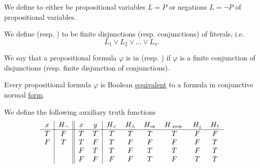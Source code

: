 \begin{Definition}\label{def:conjunctive_normal_form}
  We define  to either be propositional variables \( L = P \) or negations \( L = \neg P \) of propositional variables.

  We define  (resp. ) to be finite disjunctions (resp. conjunctions) of literals, i.e.
  \begin{equation*}
    L_1 \vee L_2 \vee \ldots \vee L_n.
  \end{equation*}

  We say that a propositional formula \( \varphi \) is in  (resp. ) if \( \varphi \) is a finite conjunction of disjunctions (resp. finite disjunction of conjunctions).
\end{Definition}

\begin{Proposition}\label{thm:conjunctive_normal_form_reduction}
  Every propositional formula \( \varphi \) is Boolean \hyperref[def:propositional_interpretation]{equivalent} to a formula in conjunctive normal \hyperref[def:conjunctive_normal_form]{form}.
\end{Proposition}

\begin{Definition}\label{def:truth_functions}
  We define the following auxiliary truth functions
  \begin{equation*}
    \begin{tabular}{c | c || c c | c c c c c c}
      \( x \)    & \( H_\neg \) & \( x \)    & \( y \)    & \( H_\vee \) & \( H_\wedge \) & \( H_\Rightarrow \) & \( H_{\iff} \) & \( H_\downarrow \) & \( H_\uparrow \) \\
      \hline
      \( T \)    & \( F \)      & \( T \)    & \( T \)    & \( T \)      & \( T \)       & \( T \)          & \( T \)      & \( F \)            & \( F \)    \\
      \( F \)    & \( T \)      & \( T \)    & \( F \)    & \( T \)      & \( F \)       & \( F \)          & \( F \)      & \( F \)            & \( T \)    \\
             &          & \( F \)    & \( T \)    & \( T \)      & \( F \)       & \( T \)          & \( T \)      & \( F \)            & \( T \)    \\
             &          & \( F \)    & \( F \)    & \( F \)      & \( F \)       & \( T \)          & \( F \)      & \( T \)            & \( T \)
    \end{tabular}
  \end{equation*}
\end{Definition}

